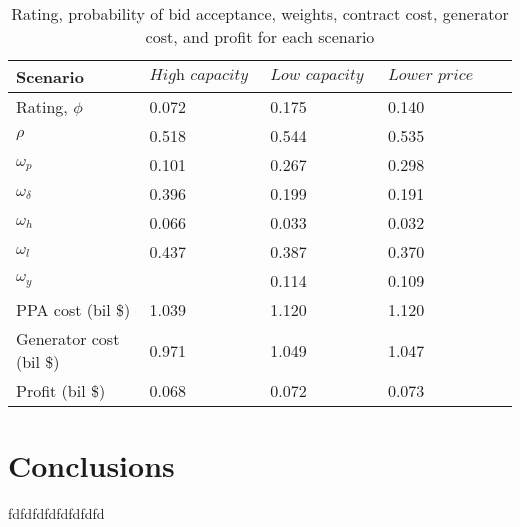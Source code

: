 \documentclass[informs]{informs3}
\begin{document}
\begin{table}[tableResults]
\caption {Rating, probability of bid acceptance, weights, contract cost, generator cost, and profit for each scenario} \label{tableResults}
\begin{tabular}{@{}llll@{}}
\toprule
Scenario                & $\textit{High capacity price}$ & $\textit{Low capacity price}$ & $\textit{Lower price volatility}$ \\ \midrule
Rating, $\phi$          & 0.072                          & 0.175                         & 0.140                             \\
$\rho$                  & 0.518                          & 0.544                         & 0.535                             \\
$\omega_p$              & 0.101                          & 0.267                         & 0.298                             \\
$\omega_{\delta}$       & 0.396                          & 0.199                         & 0.191                             \\
$\omega_h$              & 0.066                          & 0.033                         & 0.032                             \\
$\omega_l$              & 0.437                          & 0.387                         & 0.370                             \\
$\omega_y$              &                                & 0.114                         & 0.109                             \\
PPA cost (bil \$)       & 1.039                          & 1.120                         & 1.120                             \\
Generator cost (bil \$) & 0.971                          & 1.049                         & 1.047                             \\
Profit (bil \$)         & 0.068                          & 0.072                         & 0.073                             \\ \bottomrule
\end{tabular}
\end{table}




\section{Conclusions}\label{Conclusions}

fdfdfdfdfdfdfdfd
\end{document}
